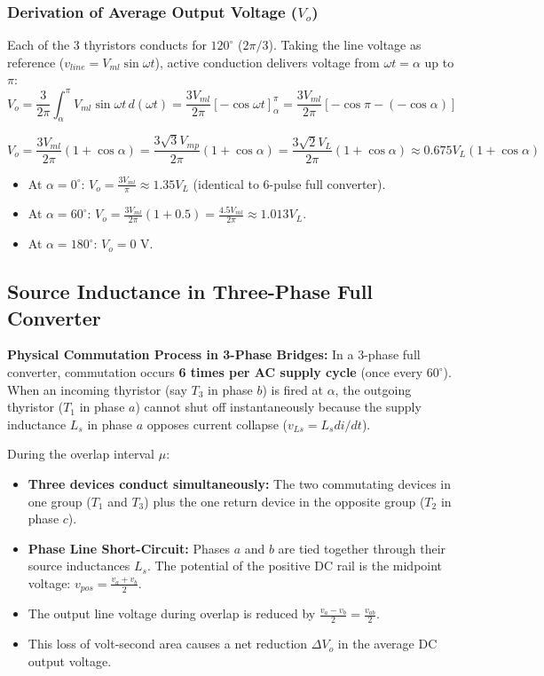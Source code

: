 \documentclass[11pt,a4paper]{article}
\renewcommand{\boxed}[1]{#1}
\begin{document}
\subsubsection{Derivation of Average Output Voltage (\texorpdfstring{$V_o$}{Vo})}
Each of the 3 thyristors conducts for $120^\circ$ ($2\pi/3$). Taking the line voltage as reference ($v_{line} = V_{ml}\sin\omega t$), active conduction delivers voltage from $\omega t = \alpha$ up to $\pi$:
\[
V_o = \frac{3}{2\pi} \int_{\alpha}^{\pi} V_{ml} \sin\omega t \, d(\omega t) = \frac{3 V_{ml}}{2\pi} [-\cos\omega t]_\alpha^\pi = \frac{3 V_{ml}}{2\pi} [-\cos\pi - (-\cos\alpha)]
\]
\begin{formulabox}
\[
\boxed{V_o = \frac{3 V_{ml}}{2\pi} (1 + \cos\alpha) = \frac{3\sqrt{3} V_{mp}}{2\pi} (1 + \cos\alpha) = \frac{3\sqrt{2} V_L}{2\pi} (1 + \cos\alpha) \approx 0.675 V_L (1 + \cos\alpha)}
\]
\begin{itemize}[leftmargin=*]
  \item At $\alpha = 0^\circ$: $V_o = \frac{3 V_{ml}}{\pi} \approx 1.35 V_L$ (identical to 6-pulse full converter).
  \item At $\alpha = 60^\circ$: $V_o = \frac{3 V_{ml}}{2\pi}(1 + 0.5) = \frac{4.5 V_{ml}}{2\pi} \approx 1.013 V_L$.
  \item At $\alpha = 180^\circ$: $V_o = 0\text{ V}$.
\end{itemize}
\end{formulabox}

\subsection{Source Inductance in Three-Phase Full Converter}

\textbf{Physical Commutation Process in 3-Phase Bridges:}
In a 3-phase full converter, commutation occurs \textbf{6 times per AC supply cycle} (once every $60^\circ$). When an incoming thyristor (say $T_3$ in phase $b$) is fired at $\alpha$, the outgoing thyristor ($T_1$ in phase $a$) cannot shut off instantaneously because the supply inductance $L_s$ in phase $a$ opposes current collapse ($v_{Ls} = L_s di/dt$).

\begin{conceptbox}
During the overlap interval $\mu$:
\begin{itemize}[leftmargin=*]
  \item \textbf{Three devices conduct simultaneously:} The two commutating devices in one group ($T_1$ and $T_3$) plus the one return device in the opposite group ($T_2$ in phase $c$).
  \item \textbf{Phase Line Short-Circuit:} Phases $a$ and $b$ are tied together through their source inductances $L_s$. The potential of the positive DC rail is the midpoint voltage: $v_{pos} = \frac{v_a + v_b}{2}$.
  \item The output line voltage during overlap is reduced by $\frac{v_a - v_b}{2} = \frac{v_{ab}}{2}$.
  \item This loss of volt-second area causes a net reduction $\Delta V_o$ in the average DC output voltage.
\end{itemize}
\end{conceptbox}
\end{document}
